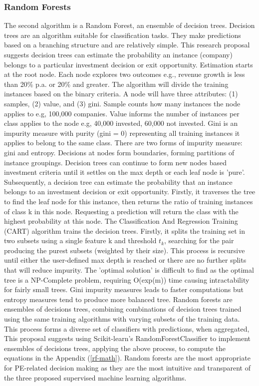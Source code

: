 \documentclass[12pt]{article}
\begin{document}
\subsubsection{Random Forests}
The second algorithm is a Random Forest, an ensemble of decision trees.
Decision trees are an algorithm suitable for classification tasks.
They make predictions based on a branching structure and are relatively simple.
This research proposal suggests decision trees can estimate the probability an instance (company) 
belongs to a particular investment decision or exit opportunity.
Estimation starts at the root node. Each node explores two outcomes e.g., revenue growth is less than 20\% p.a. or 20\% and greater.
The algorithm will divide the training instances based on the binary criteria. 
A node will have three attributes: (1) samples, (2) value, and (3) gini.
Sample counts how many instances the node applies to e.g, 100,000 companies.
Value informs the number of instances per class applies to the node e.g, 40,000 invested, 60,000 not invested.
Gini is an impurity measure with purity (gini = 0) representing all training instances it applies to belong to the same class.
There are two forms of impurity measure: gini and entropy. Decisions at nodes form boundaries, forming partitions of instance groupings.
Decision trees can continue to form new nodes based investment criteria until it settles on the max depth or each leaf node is 'pure'.
Subsequently, a decision tree can estimate the probability that an instance belongs to an investment decision or exit opportunity.
Firstly, it traverses the tree to find the leaf node for this instance, then returns the ratio of training instances of class k in this node.
Requesting a prediction will return the class with the highest probability at this node. 
The Classification And Regression Training (CART) algorithm trains the decision trees.
Firstly, it splits the training set in two subsets using a single feature k and threshold $t_k$, searching for the pair producing the purest subsets (weighted by their size).
This process is recursive until either the user-defined max depth is reached or there are no further splits that will reduce impurity.
The 'optimal solution' is difficult to find as the optimal tree is a NP-Complete problem, requiring O(exp(m)) time causing intractability for fairly small trees.
Gini impurity measures leads to faster computations but entropy measures tend to produce more balanced tree.
Random forests are ensembles of decisions trees, combining combinations of decision trees trained using the same training algorithms with varying subsets of the training data.
This process forms a diverse set of classifiers with predictions, when aggregated, 
This proposal suggests using Scikit-learn's RandomForestClassifier to implement ensembles of decisions trees, applying the above process, to compute the equations in the Appendix (\ref{rf-math}).
Random forests are the most appropriate for PE-related decision making as they are the most intuitive and transparent of the three proposed supervised machine learning algorithms.
\end{document}
